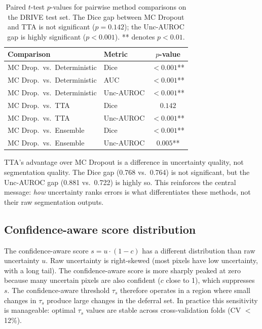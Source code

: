 \begin{table}[H]
\centering
\caption{Paired $t$-test $p$-values for pairwise method comparisons on
the DRIVE test set. The Dice gap between MC Dropout and TTA is not
significant ($p{=}0.142$); the Unc-AUROC gap is highly significant
($p{<}0.001$). ** denotes $p{<}0.01$.}
\label{tab:significance}
\scriptsize
\setlength{\tabcolsep}{3.5pt}
\renewcommand{\arraystretch}{1.03}
\begin{center}
\begin{tabular}{l l c}
\toprule
\textbf{Comparison} & \textbf{Metric} & $p$-\textbf{value} \\
\midrule
MC Drop.\ vs.\ Deterministic & Dice      & $<0.001$** \\
MC Drop.\ vs.\ Deterministic & AUC       & $<0.001$** \\
MC Drop.\ vs.\ Deterministic & Unc-AUROC & $<0.001$** \\
\addlinespace[2pt]
\midrule
\addlinespace[2pt]
MC Drop.\ vs.\ TTA           & Dice      & $0.142$\phantom{**} \\
MC Drop.\ vs.\ TTA           & Unc-AUROC & $<0.001$** \\
\addlinespace[2pt]
\midrule
\addlinespace[2pt]
MC Drop.\ vs.\ Ensemble      & Dice      & $<0.001$** \\
MC Drop.\ vs.\ Ensemble      & Unc-AUROC & $0.005$** \\
\bottomrule
\end{tabular}
\end{center}
\end{table}

TTA's advantage over MC Dropout is a difference in uncertainty quality,
not segmentation quality. The Dice gap (0.768 vs.\ 0.764) is not
significant, but the Unc-AUROC gap (0.881 vs.\ 0.722) is highly so. This
reinforces the central message: \emph{how} uncertainty ranks errors is
what differentiates these methods, not their raw segmentation outputs.

\subsection{Confidence-aware score distribution}

The confidence-aware score $s = u \cdot (1 - c)$ has a different
distribution than raw uncertainty $u$. Raw uncertainty is right-skewed
(most pixels have low uncertainty, with a long tail). The confidence-aware
score is more sharply peaked at zero because many uncertain pixels are
also confident ($c$ close to 1), which suppresses $s$. The confidence-aware
threshold $\tau_s$ therefore operates in a region where small changes in
$\tau_s$ produce large changes in the deferral set. In practice this
sensitivity is manageable: optimal $\tau_s$ values are stable across
cross-validation folds (CV $<$ 12\%).

